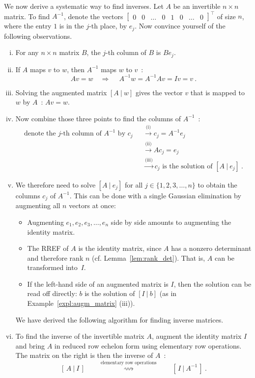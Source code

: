 \begin{remark}
\label{rem:inverses}
We now derive a systematic way to find inverses. Let $A$ be an invertible $n \times n$ matrix. To find $A^{-1}$, denote the vectors $\begin{bmatrix}
0 & 0 & \dots & 0 & 1 & 0 & \dots & 0 
\end{bmatrix}^{\top}$ of size $n$, where the entry $1$ is in the $j$-th place, by $e_j$. Now convince yourself of the following observations.
\begin{enumerate}[(i)]
	\item For any $n \times n$ matrix $B$, the $j$-th column of $B$ is $Be_j$.
	\item If $A$ maps $v$ to $w$, then $A^{-1}$ maps $w$ to $v$~:
\[ Av=w \quad \Longrightarrow\ \quad A^{-1}w=A^{-1}Av = Iv = v \:. \]
	\item Solving the augmented matrix $[A\:|\:w]$ gives the vector $v$ that is mapped to $w$ by $A$~: $Av=w$.
	\item Now combine those three points to find the columns of $A^{-1}$~:
\begin{equation*}
\begin{split}
\text{denote the $j$-th column of $A^{-1}$ by $c_j$ } & 
\stackrel{\text{(i)}}{\longrightarrow}
c_j=A^{-1}e_j \\
& \stackrel{\text{(ii)}}{\longrightarrow}
Ac_j=e_j \\
& \stackrel{\text{(iii)}}{\longrightarrow}
c_j \text{~is the solution of~} [A\:|\:e_j] \:.
\end{split}
\end{equation*}
	\item We therefore need to solve $[A\:|\:e_j]$ for all $j\in\{1,2,3,\dots,n\}$ to obtain the columns $c_j$ of $A^{-1}$. This can be done with a single Gaussian elimination by augmenting all $n$ vectors at once:
	\begin{itemize}
		\item Augmenting $e_1,e_2,e_3,\ldots,e_n$ side by side amounts to augmenting the identity matrix.
		\item The RREF of $A$ is the identity matrix, since $A$ has a nonzero determinant and therefore rank $n$ (cf. Lemma~\ref{lem:rank_det}). That is, $A$ can be transformed into~$I$.
		\item If the left-hand side of an augmented matrix is $I$, then the solution can be read off directly: $b$ is the solution of $[I\:|\:b]$ (as in Example~\ref{expl:augm_matrix} (iii)).
	\end{itemize}

	We have derived the following algorithm for finding inverse matrices.
	\item To find the inverse of the invertible matrix $A$, augment the identity matrix $I$ and bring $A$ in reduced row echelon form using elementary row operations. The matrix on the right is then the inverse of $A$~:
	\[ [\,A\:|\:I\,] \qquad
	\stackrel{\text{elementary row operations}}{\rightsquigarrow}
	\qquad [\,I\:|\:A^{-1}\,] \:. \]
\end{enumerate}
\end{remark}

